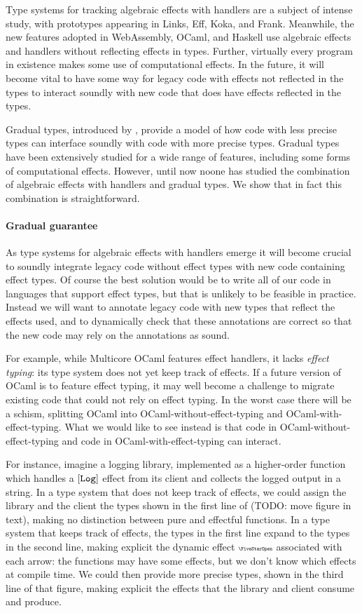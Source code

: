 Type systems for tracking algebraic effects with handlers are a subject of intense study,
with prototypes appearing in Links, Eff, Koka, and Frank.
Meanwhile, the new features adopted in WebAssembly, OCaml, and Haskell
use algebraic effects and handlers without reflecting effects in types.
Further, virtually every program in existence makes some use of computational
effects. In the future, it will become vital to have some way for legacy
code with effects not reflected in the types to interact soundly with
new code that does have effects reflected in the types.

Gradual types, introduced by \citet{siek-taha-2006},
provide a model of how code with less precise types can interface soundly with
code with more precise types. Gradual types have been extensively studied for a wide
range of features, including some forms of computational effects. However,
until now noone has studied the combination of algebraic effects
with handlers and gradual types. We show that in fact this combination
is straightforward.

\paragraph{Gradual guarantee}
As type systems for algebraic effects with handlers emerge
it will become crucial to soundly integrate legacy code without effect types
with new code containing effect types. Of course the best solution would be
to write all of our code in languages that support effect types,
but that is unlikely to be feasible in practice.
Instead we will want to annotate legacy code with new types that reflect
the effects used, and to dynamically check that these annotations
are correct so that the new code may rely on the annotations as sound.

For example,
while Multicore OCaml features effect handlers, it lacks \emph{effect typing}:
its type system does not yet keep track of effects.
If a future version of OCaml is to feature effect typing,
it may well become a challenge to migrate existing code that could
not rely on effect typing. In the worst case there will be a
schism, splitting OCaml into OCaml-without-effect-typing and
OCaml-with-effect-typing. What we would like to see instead
is that code in OCaml-without-effect-typing and
code in OCaml-with-effect-typing can interact.

For instance, imagine a logging library, implemented as a higher-order function
which handles a ${[\texttt{Log}]}$ effect from its client and collects the logged output
in a string. In a type system that does not keep track of effects, we could assign the
library and the client the types shown in the first line of
(TODO: move figure in text), making no distinction between pure and effectful
functions.
In a type system that keeps track of effects, the types in the first line
expand to the types in the second line, making explicit the dynamic effect $\effany$
associated with each arrow: the functions may have some effects, but we
don't know which effects at compile time.
We could then provide more precise types,
shown in the third line of that figure,
making explicit the effects that the library and client consume and produce.

